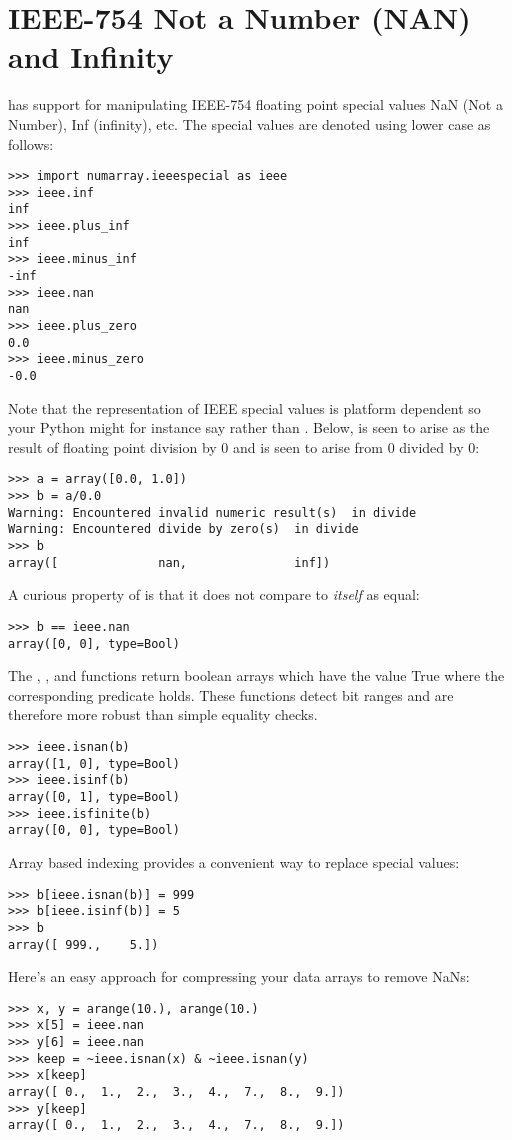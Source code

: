 \section{IEEE-754 Not a Number (NAN) and Infinity}
\label{sec:ieee-special-values}
 has support for manipulating IEEE-754 floating
point special values NaN (Not a Number), Inf (infinity), etc.  The special
values are denoted using lower case as follows:
\begin{verbatim}
>>> import numarray.ieeespecial as ieee
>>> ieee.inf
inf
>>> ieee.plus_inf
inf
>>> ieee.minus_inf
-inf
>>> ieee.nan
nan
>>> ieee.plus_zero
0.0
>>> ieee.minus_zero
-0.0
\end{verbatim}
Note that the representation of IEEE special values is platform dependent so
your Python might for instance say  rather than .
Below,  is seen to arise as the result of floating point division by 0
and  is seen to arise from 0 divided by 0:
\begin{verbatim}
>>> a = array([0.0, 1.0])
>>> b = a/0.0
Warning: Encountered invalid numeric result(s)  in divide
Warning: Encountered divide by zero(s)  in divide
>>> b
array([              nan,               inf])
\end{verbatim}
A curious property of  is that it does not compare to \emph{itself} as
equal:
\begin{verbatim}
>>> b == ieee.nan
array([0, 0], type=Bool)
\end{verbatim}
The , , and  functions
return boolean arrays which have the value True where the corresponding
predicate holds.  These functions detect bit ranges and are therefore more
robust than simple equality checks.
\begin{verbatim}
>>> ieee.isnan(b)
array([1, 0], type=Bool)
>>> ieee.isinf(b)
array([0, 1], type=Bool)
>>> ieee.isfinite(b)
array([0, 0], type=Bool)
\end{verbatim}
Array based indexing provides a convenient way to replace special values:
\begin{verbatim}
>>> b[ieee.isnan(b)] = 999
>>> b[ieee.isinf(b)] = 5
>>> b
array([ 999.,    5.])
\end{verbatim}

Here's an easy approach for compressing your data arrays to remove
NaNs:
\begin{verbatim}
>>> x, y = arange(10.), arange(10.)
>>> x[5] = ieee.nan
>>> y[6] = ieee.nan
>>> keep = ~ieee.isnan(x) & ~ieee.isnan(y)
>>> x[keep]
array([ 0.,  1.,  2.,  3.,  4.,  7.,  8.,  9.])
>>> y[keep]
array([ 0.,  1.,  2.,  3.,  4.,  7.,  8.,  9.])
\end{verbatim}


